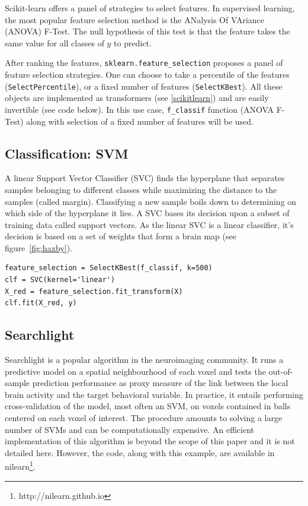 \documentclass{frontiersSCNS} %
\begin{document}
Scikit-learn offers a panel of strategies to select features. In supervised
learning, the most popular feature selection method is the
ANalysis Of VAriance (ANOVA) F-Test. 
The null hypothesis of this test is that the feature takes the same value
for all classes of $y$ to predict.

After ranking the features, \verb!sklearn.feature_selection! proposes a panel
of feature selection strategies. One can choose to take a percentile of the features
(\verb!SelectPercentile!), or a fixed number of features (\verb!SelectKBest!).
All these objects are implemented as transformers (see
\ref{scikitlearn}) and are easily invertible (see code below).
In this use case, \verb!f_classif! function (ANOVA F-Test) along with selection
of a fixed number of features will be used.

\subsection{Classification: SVM}

A linear Support Vector Classifier (SVC) finds the hyperplane that
separates samples belonging to different classes while maximizing the
distance to the samples (called margin). Classifying a new sample boils
down to determining on which side of the hyperplane it lies. A SVC bases
its decision upon a subset of training data called support vectors. As
the linear SVC is a linear classifier, it's decision is based on a set of
weights that form a brain map (see figure~\ref{fig:haxby}).

\begin{lstlisting}
feature_selection = SelectKBest(f_classif, k=500)
clf = SVC(kernel='linear')
X_red = feature_selection.fit_transform(X)
clf.fit(X_red, y)
\end{lstlisting}

\subsection{Searchlight}
\label{searchlight}

Searchlight \citep{kriegeskorte2006} is a popular algorithm in the
neuroimaging community. It runs a predictive model on a spatial
neighbourhood of each voxel and tests the out-of-sample prediction
performance as proxy measure of the link between the local brain activity
and the target behavioral variable. In practice, it entails performing
cross-validation of the model, most often an SVM, on voxels contained in
balls centered on each voxel of interest. The procedure amounts to
solving a large number of SVMs and can be computationally expensive.
An efficient implementation of this algorithm is beyond the scope of this
paper and it is not detailed here. However, the code, along with this example,
are available in nilearn\footnote{http://nilearn.github.io}.
\end{document}

